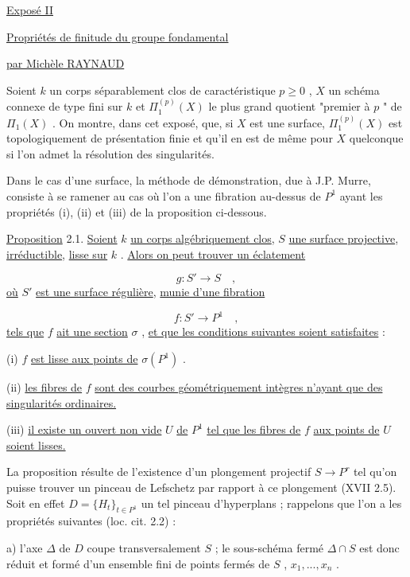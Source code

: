 


\underline{Exposé II}


\underline{\underline{Propriétés de finitude du groupe fondamental}}


\underline{par Michèle RAYNAUD}

Soient  $k$  un corps séparablement clos de caractéristique  $p \geqslant 0$ , $X$  un schéma connexe de type fini sur  $k$  et  $\Pi_1^{(p)}(X)$  le plus grand quotient "premier à $p$ " de  $\Pi_1(X)$ . On montre, dans cet exposé, que, si  $X$  est une surface, $\Pi_1^{(p)}(X)$  est topologiquement de présentation finie et qu'il en est de même pour  $X$  quelconque si l'on admet la résolution des singularités.

Dans le cas d'une surface, la méthode de démonstration, due à J.P. Murre, consiste à se ramener au cas où l'on a une fibration au-dessus de  $P^1$  ayant les propriétés (i), (ii) et (iii) de la proposition ci-dessous.

\underline{Proposition} 2.1.  \underline{Soient}  $k$  \underline{un corps algébriquement clos},  $S$  \underline{une surface projective}, \underline{irréductible}, \underline{lisse sur}  $k$ . \underline{Alors on peut trouver un éclatement}

\[ g : S' \longrightarrow S \quad , \]
\underline{où}  $S'$  \underline{est une surface régulière}, \underline{munie d'une fibration}

\[ f : S' \longrightarrow P^1 \quad , \]
\underline{tels que}  $f$  \underline{ait une section}  $\sigma$  , \underline{et que les conditions suivantes soient satisfaites} :

(i)   $f$  \underline{est lisse aux points de}  $\sigma(P^1)$ .

(ii)  \underline{les fibres de}  $f$  \underline{sont des courbes géométriquement intègres n'ayant que des singularités ordinaires.}

(iii) \underline{il existe un ouvert non vide}  $U$  \underline{de}  $P^1$  \underline{tel que les fibres de}  $f$  \underline{aux points de}  $U$  \underline{soient lisses.}

La proposition résulte de l'existence d'un plongement projectif  $S \longrightarrow P^r$  tel qu'on puisse trouver un pinceau de Lefschetz par rapport à ce plongement (XVII 2.5). Soit en effet  $D = \{H_t\}_{t \in P^1}$  un tel pinceau d'hyperplans ; rappelons que l'on
a les propriétés suivantes (loc. cit. 2.2) :

a) l'axe  $\Delta$  de  $D$  coupe transversalement  $S$ ; le sous-schéma fermé  $\Delta \cap S$  est donc réduit et formé d'un ensemble fini de points fermés de  $S$ , $x_1,...,x_n$ .


